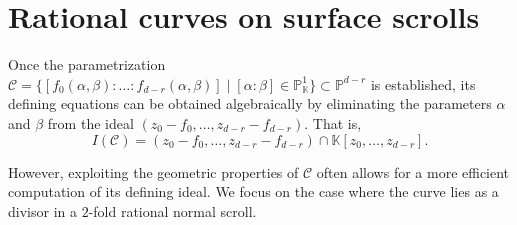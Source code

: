 \documentclass[a4paper, 11pt]{amsart}
\numberwithin{theorem}{section}
\theoremstyle{definition}
\numberwithin{equation}{section}
\begin{document}
\section{Rational curves on surface scrolls}\label{sec:curvesinSurfacescroll}
Once the parametrization $\mathcal{C} = \{[f_0(\alpha,\beta) : \dots : f_{d-r}(\alpha,\beta)] \mid [\alpha:\beta]\in \mathbb{P}_{\mathbb{K}}^1\} \subset \mathbb{P}^{d-r}$ is established, its defining equations can be obtained algebraically by eliminating the parameters $\alpha$ and $\beta$ from the ideal $(z_0 - f_0, \dots, z_{d-r} - f_{d-r})$.
That is, 
\[
I(\mathcal{C}) = (z_0 - f_0, \dots, z_{d-r} - f_{d-r}) \cap \mathbb{K}[z_0,\dots,z_{d-r}].
\]

However, exploiting the geometric properties of $\mathcal{C}$ often allows for a more efficient computation of its defining ideal. 
We focus on the case where the curve lies as a divisor in a $2$-fold rational normal scroll.
\end{document}
